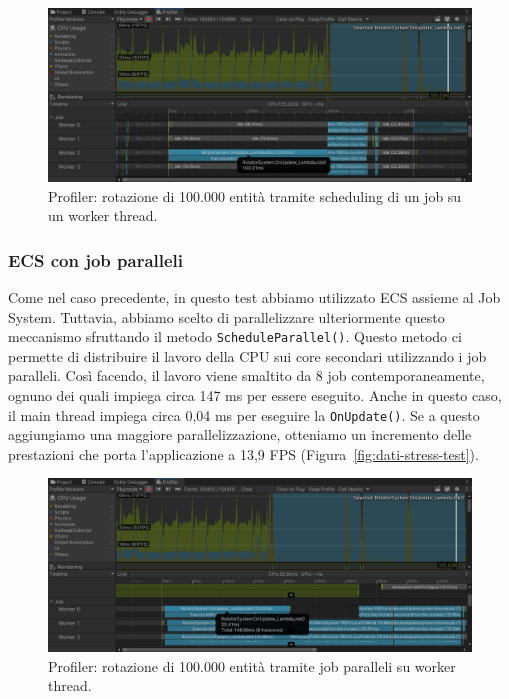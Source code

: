 \begin{figure}[!ht]
    \centering
    \includegraphics[width=0.95\columnwidth]{gfx/imgs/chapter5/ProfilerStressTest100k(3).png}
    \caption{Profiler: rotazione di 100.000 entità tramite scheduling di un job su un worker thread.}
    \label{fig:profiler-100k(3)}
\end{figure}

\subsubsection{ECS con job paralleli}
Come nel caso precedente, in questo test abbiamo utilizzato ECS assieme al Job System. Tuttavia, abbiamo scelto di parallelizzare ulteriormente questo meccanismo sfruttando il metodo \verb|ScheduleParallel()|. Questo metodo ci permette di distribuire il lavoro della CPU sui core secondari utilizzando i job paralleli.
Così facendo, il lavoro viene smaltito da 8 job contemporaneamente, ognuno dei quali impiega circa 147 ms per essere eseguito. Anche in questo caso, il main thread impiega circa 0,04 ms per eseguire la \verb|OnUpdate()|. Se a questo aggiungiamo una maggiore parallelizzazione, otteniamo un incremento delle prestazioni che porta l'applicazione a 13,9 FPS (Figura~\ref{fig:dati-stress-test}).

\begin{figure}[!ht]
    \centering
    \includegraphics[width=0.95\columnwidth]{gfx/imgs/chapter5/ProfilerStressTest100k(4).png}
    \caption{Profiler: rotazione di 100.000 entità tramite job paralleli su worker thread.}
    \label{fig:profiler-100k(4)}
\end{figure}


